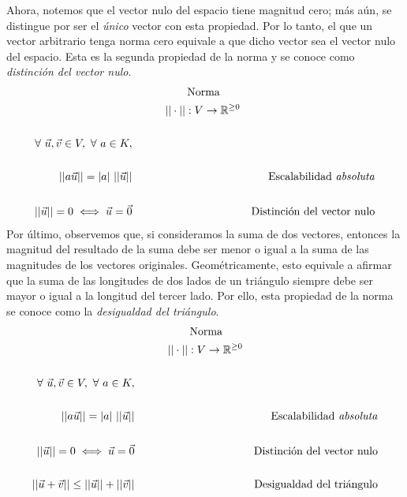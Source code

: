 \documentclass[12pt,dvipsnames]{article}
\numberwithin{equation}{section}
\begin{document}
Ahora, notemos que el vector nulo del espacio tiene magnitud cero; más aún, se distingue por ser el \emph{único} vector con esta propiedad. Por lo tanto, el que un vector arbitrario tenga norma cero equivale a que dicho vector sea el vector nulo del espacio. Esta es la segunda propiedad de la norma y se conoce como \emph{distinción del vector nulo}. %
\begin{align*}
     &\quad \quad \quad \quad \quad \text{Norma}& \\
     &\quad \quad \quad ||\cdot||:V\to \mathbb{R}^{\ge0}& \\
     \\
     \forall \ \vec{u},\vec{v}\in V, \ \forall \ a\in K, \\
    \\
    ||a\vec{u}|| = |a| \ ||\vec{u}|| &&\text{Escalabilidad \emph{absoluta}} \\
     \\
    ||\vec{u}|| = 0 \iff \vec{u} = \vec{0} &&\text{Distinción del vector nulo}
\end{align*}
Por último, observemos que, si consideramos la suma de dos vectores, entonces la magnitud del resultado de la suma debe ser menor o igual a la suma de las magnitudes de los vectores originales. Geométricamente, esto equivale a afirmar que la suma de las longitudes de dos lados de un triángulo siempre debe ser mayor o igual a la longitud del tercer lado. Por ello, esta propiedad de la norma se conoce como la \emph{desigualdad del triángulo}.
\begin{align*}
     &\quad \quad \quad \quad \quad \text{Norma}& \\
     &\quad \quad \quad ||\cdot||:V\to \mathbb{R}^{\ge0}& \\
     \\
     \forall \ \vec{u}, \vec{v}\in V, \ \forall \ a\in K, \\
    \\
    ||a\vec{u}|| = |a| \ ||\vec{u}|| &&\text{Escalabilidad \emph{absoluta}} \\
     \\
    ||\vec{u}|| = 0 \iff \vec{u} = \vec{0} &&\text{Distinción del vector nulo} \\
    \\
    ||\vec{u}+\vec{v}|| \le ||\vec{u}|| + ||\vec{v}|| &&\text{Desigualdad del triángulo}
\end{align*}
\end{document}
